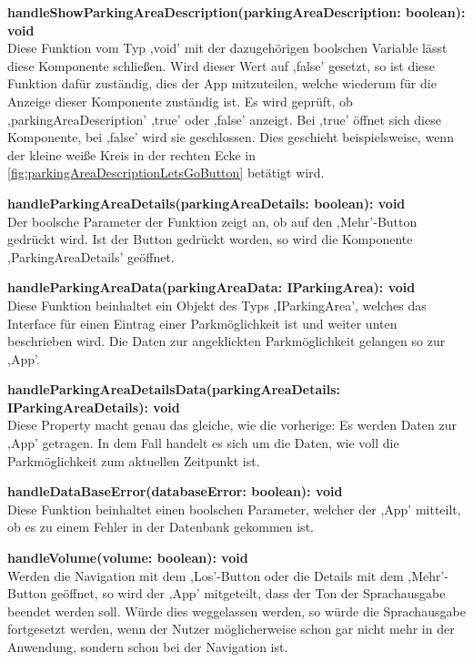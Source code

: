 \begin{description}
\begin{figure}[h!]
		\label{fig:parkingAreaDescriptionLetsGoButton}
	\end{figure}
	\item \textbf{handleShowParkingAreaDescription(parkingAreaDescription: boolean): void} \\ Diese Funktion vom Typ ,void' mit der dazugehörigen boolschen Variable lässt diese Komponente schließen. Wird dieser Wert auf ,false' gesetzt, so ist diese Funktion dafür zuständig, dies der App mitzuteilen, welche wiederum für die Anzeige dieser Komponente zuständig ist. Es wird geprüft, ob ,parkingAreaDescription' ,true' oder ,false' anzeigt. Bei ,true' öffnet sich diese Komponente, bei ,false' wird sie geschlossen. Dies geschieht beispielsweise, wenn der kleine weiße Kreis in der rechten Ecke in \autoref{fig:parkingAreaDescriptionLetsGoButton} betätigt wird.
	\item \textbf{handleParkingAreaDetails(parkingAreaDetails: boolean): void} \\ Der boolsche Parameter der Funktion zeigt an, ob auf den ,Mehr'-Button gedrückt wird. Ist der Button gedrückt worden, so wird die Komponente ,ParkingAreaDetails' geöffnet.
	\item \textbf{handleParkingAreaData(parkingAreaData: IParkingArea): void} \\ Diese Funktion beinhaltet ein Objekt des Typs ,IParkingArea', welches das Interface für einen Eintrag einer Parkmöglichkeit ist und weiter unten beschrieben wird. Die Daten zur angeklickten Parkmöglichkeit gelangen so zur ,App'.
	\newpage
	\item \textbf{handleParkingAreaDetailsData(parkingAreaDetails: IParkingAreaDetails): void} \\ Diese Property macht genau das gleiche, wie die vorherige: Es werden Daten zur ,App' getragen. In dem Fall handelt es sich um die Daten, wie voll die Parkmöglichkeit zum aktuellen Zeitpunkt ist.
	\item \textbf{handleDataBaseError(databaseError: boolean): void} \\ Diese Funktion beinhaltet einen boolschen Parameter, welcher der ,App' mitteilt, ob es zu einem Fehler in der Datenbank gekommen ist.
	\item \textbf{handleVolume(volume: boolean): void} \\ Werden die Navigation mit dem ,Los'-Button oder die Details mit dem ,Mehr'-Button geöffnet, so wird der ,App' mitgeteilt, dass der Ton der Sprachausgabe beendet werden soll. Würde dies weggelassen werden, so würde die Sprachausgabe fortgesetzt werden, wenn der Nutzer möglicherweise schon gar nicht mehr in der Anwendung, sondern schon bei der Navigation ist.
\end{description}

